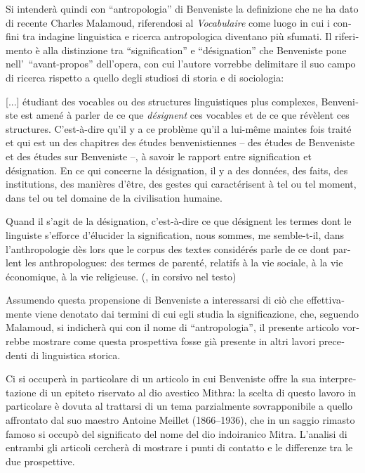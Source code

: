 \documentclass[french,output=paper,colorlinks,citecolor=brown]{../langscibook}
\begin{document}
\begin{otherlanguage}{italian}
Si intenderà quindi con “antropologia” di Benveniste la definizione che ne ha dato di recente Charles Malamoud, riferendosi al \textit{Vocabulaire} come luogo in cui i confini tra indagine linguistica e ricerca antropologica diventano più sfumati. Il riferimento è alla distinzione tra “signification” e “désignation” che Benveniste pone nell’~“avant-propos” dell’opera, con cui l’autore vorrebbe delimitare il suo campo di ricerca rispetto a quello degli studiosi di storia e di sociologia:

\begin{modquote}{}
    [...] étudiant des vocables ou des structures linguistiques plus complexes, Benveniste est amené à parler de ce que \textit{désignent} ces vocables et de ce que révèlent ces structures. C’est-à-dire qu’il y a ce problème qu’il a lui-même maintes fois traité et qui est un des chapitres des études benvenistiennes – des études de Benveniste et des études sur Benveniste –, à savoir le rapport entre signification et désignation.  En ce qui concerne la désignation, il y a des données, des faits, des institutions, des manières d’être, des gestes qui caractérisent à tel ou tel moment, dans tel ou tel domaine de la civilisation humaine. 

    Quand il s’agit de la désignation, c’est-à-dire ce que désignent les termes dont le linguiste s’efforce d’élucider la signification, nous sommes, me semble-t-il, dans l’anthropologie dès lors que le corpus des textes considérés parle de ce dont parlent les anthropologues: des termes de parenté, relatifs à la vie sociale, à la vie économique, à la vie religieuse. (\citealt[246]{Malamoud2016}, in corsivo nel testo)
\end{modquote}

Assumendo questa propensione di Benveniste a interessarsi di ciò che effettivamente viene denotato dai termini di cui egli studia la significazione, che, seguendo Malamoud, si indicherà qui con il nome di “antropologia”, il presente articolo vorrebbe mostrare come questa prospettiva fosse già presente in altri lavori precedenti di linguistica storica. 

Ci si occuperà in particolare di un articolo in cui Benveniste offre la sua interpretazione di un epiteto riservato al dio avestico Mithra: la scelta di questo lavoro in particolare è dovuta al trattarsi di un tema parzialmente sovrapponibile a quello affrontato dal suo maestro Antoine Meillet (1866--1936), che in un saggio rimasto famoso si occupò del significato del nome del dio indoiranico Mitra. L’analisi di entrambi gli articoli cercherà di mostrare i punti di contatto e le differenze tra le due prospettive.


\end{otherlanguage}
\end{document}
